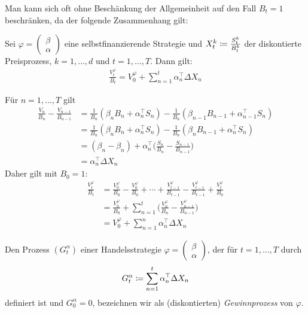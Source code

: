 \documentclass[a4paper,twoside,DIV15,BCOR12mm]{scrbook}
\begin{document}
Man kann sich oft ohne Beschänkung der Allgemeinheit auf den Fall $B_t=1$ beschränken, da der folgende Zusammenhang gilt:
\begin{lemma}
\label{lem:2.3.6}Sei $\varphi
=\left(\begin{smallmatrix}
\beta \\ \alpha
\end{smallmatrix}\right)$ eine selbstfinanzierende Strategie und $X_t^k \da \frac{S_t^k}{B_t^k}$ der diskontierte Preisprozess, $k=1,\ldots,d$ und $t=1,\ldots,T$. Dann gilt:
\begin{align*}
\frac{V_t^\varphi}{B_t} = V_0^\varphi + \sum_{n=1}^t \alpha_n^\top \Delta X_n
\end{align*}
\end{lemma}

\begin{beweis}
Für $n=1,\ldots,T$ gilt
\begin{align*}
\frac{V_n}{B_n} - \frac{V_{n-1}}{B_{n-1}} 
&= \frac 1 {B_n} (\beta_n B_n + \alpha_n^\top S_n) - \frac1{B_n}(\beta_{n-1}B_{n-1} + \alpha_{n-1}^\top S_n) \\
&= \frac 1 {B_n} (\beta_n B_n + \alpha_n^\top S_n) - \frac1{B_n}(\beta_{n}B_{n-1} + \alpha_{n}^\top S_n) \\
&= (\beta_n - \beta_n) + \alpha_n^\top \bigg(\frac{S_n}{B_n} - \frac{S_{n-1}}{B_{n-1}}\bigg) \\
&= \alpha_n^\top \Delta X_n
\end{align*}
Daher gilt mit $B_0=1$:
\begin{align*}
\frac{V_t^\varphi}{B_t} 
&= \frac{V_0^\varphi}{B_0} - \frac{V_0^\varphi}{B_0} + \cdots + \frac{V_{t-1}^\varphi}{B_{t-1}} - \frac{V_{t-1}^\varphi}{B_{t-1}} + \frac{V_t^\varphi}{B_0} \\
&= \frac{V_0^\varphi}{B_0} + \sum_{n=1}^t \bigg(\frac{V_n^\varphi}{B_n} -  \frac{V_{n-1}^\varphi}{B_{n-1}}\bigg) \\
&= V_0^\varphi + \sum_{n=1}^n \alpha_n^\top \Delta X_n
\end{align*}
\end{beweis}

\begin{definition}
Den Prozess $(G_t^\alpha)$ einer Handelsstrategie $\varphi
=\left(\begin{smallmatrix}
\beta \\ \alpha
\end{smallmatrix}\right)$, der für $t=1,\ldots,T$ durch
\[
G_t^\alpha  \da \sum_{n=1}^t \alpha_n^\top \Delta X_n
\]
definiert ist und $G_0^\alpha = 0$, bezeichnen wir als (diskontierten) \emph{Gewinnprozess} von $\varphi$.
\end{definition}
\end{document}

